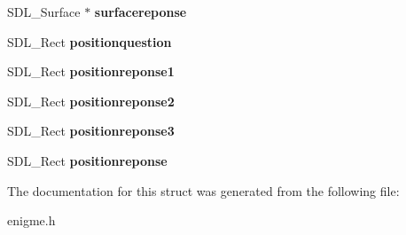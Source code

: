 \begin{DoxyCompactItemize}
S\+D\+L\+\_\+\+Surface $\ast$ {\bfseries surfacereponse}
\item 
\mbox{\label{structenigme_ab48781ff6124fafba553b765106dac7a}} 
S\+D\+L\+\_\+\+Rect {\bfseries positionquestion}
\item 
\mbox{\label{structenigme_a695033fead90c8743598597f1bcba174}} 
S\+D\+L\+\_\+\+Rect {\bfseries positionreponse1}
\item 
\mbox{\label{structenigme_a13d44ca27ae6652e4adf017a6d0aed66}} 
S\+D\+L\+\_\+\+Rect {\bfseries positionreponse2}
\item 
\mbox{\label{structenigme_af8907b505c9385b61b10f0e65b68b5ff}} 
S\+D\+L\+\_\+\+Rect {\bfseries positionreponse3}
\item 
\mbox{\label{structenigme_ade8cce5e5aab364b6751cf9edc487a36}} 
S\+D\+L\+\_\+\+Rect {\bfseries positionreponse}
\end{DoxyCompactItemize}


The documentation for this struct was generated from the following file\+:\begin{DoxyCompactItemize}
\item 
enigme.\+h\end{DoxyCompactItemize}
